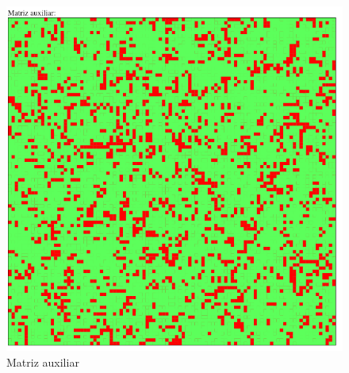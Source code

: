 	\begin{figure}[H]
		\begin{center}
			\includegraphics[scale=.3]{GOLM/img/regla2746-3-1.png}
			\caption{Matriz auxiliar}
			\label{fig:golm7}
		\end{center}
	\end{figure}



